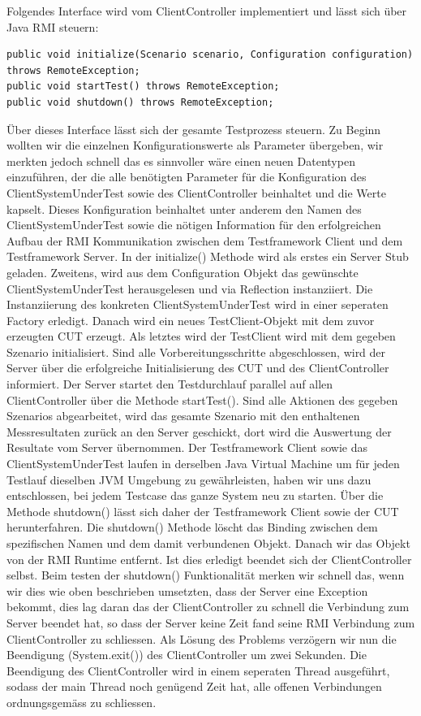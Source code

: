 Folgendes Interface wird vom ClientController implementiert und lässt sich über Java RMI steuern:
\begin{lstlisting}	
public void initialize(Scenario scenario, Configuration configuration) throws RemoteException;
public void startTest() throws RemoteException;
public void shutdown() throws RemoteException;
\end{lstlisting}
Über dieses Interface lässt sich der gesamte Testprozess steuern. Zu Beginn wollten wir die einzelnen Konfigurationswerte als Parameter übergeben, wir merkten jedoch schnell das es sinnvoller wäre einen neuen Datentypen einzuführen, der die alle benötigten Parameter für die Konfiguration des ClientSystemUnderTest sowie des ClientController beinhaltet und die Werte kapselt. Dieses Konfiguration beinhaltet unter anderem den Namen des ClientSystemUnderTest sowie die nötigen Information für den erfolgreichen Aufbau der RMI Kommunikation zwischen dem Testframework Client und dem Testframework Server. In der initialize() Methode wird als erstes ein Server Stub geladen. Zweitens, wird aus dem Configuration Objekt das gewünschte ClientSystemUnderTest herausgelesen und via Reflection instanziiert. Die Instanziierung des konkreten ClientSystemUnderTest wird in einer seperaten Factory erledigt. Danach wird ein neues TestClient-Objekt mit dem zuvor erzeugten CUT erzeugt. Als letztes wird der TestClient wird mit dem gegeben Szenario initialisiert. Sind alle Vorbereitungsschritte abgeschlossen, wird der Server über die erfolgreiche Initialisierung des CUT und des ClientController informiert. Der Server startet den Testdurchlauf parallel auf allen ClientController über die Methode startTest(). Sind alle Aktionen des gegeben Szenarios abgearbeitet, wird das gesamte Szenario mit den enthaltenen Messresultaten zurück an den Server geschickt, dort wird die Auswertung der Resultate vom Server übernommen. Der Testframework Client sowie das ClientSystemUnderTest laufen in derselben Java Virtual Machine um für jeden Testlauf dieselben JVM Umgebung zu gewährleisten, haben wir uns dazu entschlossen, bei jedem Testcase das ganze System neu zu starten. Über die Methode shutdown() lässt sich daher der Testframework Client sowie der CUT herunterfahren. Die shutdown() Methode löscht das Binding zwischen dem spezifischen Namen und dem damit verbundenen Objekt. Danach wir das Objekt von der RMI Runtime entfernt. Ist dies erledigt beendet sich der ClientController selbst. Beim testen der shutdown() Funktionalität merken wir schnell das, wenn wir dies wie oben beschrieben umsetzten, dass der Server eine Exception bekommt, dies lag daran das der ClientController zu schnell die Verbindung zum Server beendet hat, so dass der Server keine Zeit fand seine RMI Verbindung zum ClientController zu schliessen. Als Lösung des Problems verzögern wir nun die Beendigung (System.exit()) des ClientController um zwei Sekunden. Die Beendigung des ClientController wird in einem seperaten Thread ausgeführt, sodass der main Thread noch genügend Zeit hat, alle offenen Verbindungen ordnungsgemäss zu schliessen.    

